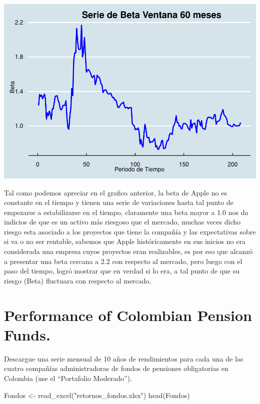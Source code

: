 \documentclass[
  12pt,
]{article}
\newenvironment{Shaded}{\begin{snugshade}}{\end{snugshade}}
\newcommand{\FunctionTok}[1]{\textcolor[rgb]{0.00,0.00,0.00}{#1}}
\newcommand{\NormalTok}[1]{#1}
\newcommand{\OtherTok}[1]{\textcolor[rgb]{0.56,0.35,0.01}{#1}}
\newcommand{\StringTok}[1]{\textcolor[rgb]{0.31,0.60,0.02}{#1}}
\begin{document}
\begin{center}\includegraphics[width=0.95\linewidth]{figurasR/unnamed-chunk-17-1} \end{center}

Tal como podemos apreciar en el grafico anterior, la beta de Apple no es
constante en el tiempo y tienen una serie de variaciones hasta tal punto
de empezarse a estabilizarse en el tiempo, claramente una beta mayor a
1.0 nos da indicios de que es un activo más riesgoso que el mercado,
muchas veces dicho riesgo esta asociado a los proyectos que tiene la
compañía y las expectativas sobre si va o no ser rentable, sabemos que
Apple históricamente en sus inicios no era considerada una empresa cuyos
proyectos eran realizables, es por eso que alcanzó a presentar una beta
cercana a 2.2 con respecto al mercado, pero luego con el paso del
tiempo, logró mostrar que en verdad si lo era, a tal punto de que su
riesgo (Beta) fluctuara con respecto al mercado.

\hypertarget{performance-of-colombian-pension-funds.}{%
\section{Performance of Colombian Pension
Funds.}\label{performance-of-colombian-pension-funds.}}

Descargue una serie mensual de 10 años de rendimientos para cada una de
las cuatro compañías administradoras de fondos de pensiones obligatorias
en Colombia (use el ``Portafolio Moderado'').

\begin{Shaded}
\begin{Highlighting}[]
\NormalTok{Fondos }\OtherTok{\textless{}{-}} \FunctionTok{read\_excel}\NormalTok{(}\StringTok{"retornos\_fondos.xlsx"}\NormalTok{)}
\FunctionTok{head}\NormalTok{(Fondos)}
\end{Highlighting}
\end{Shaded}
\end{document}
